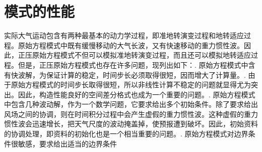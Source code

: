 \documentclass[a4paper,12pt]{article}
\begin{document}
\section{模式的性能}
实际大气运动包含有两种最基本的动力学过程，即准地转演变过程和地转适应过程。原始方程模式中既有缓慢移动的大气长波，又有快速移动的重力惯性波。因此，正压原始方程模式不但可以模拟准地转演变过程，而且还可以模拟地转适应过程。但是，正压原始方程模式也存在许多问题，现列出如下：.	原始方程模式中含有快波解，为保证计算的稳定，时间步长必须取得很短，因而增大了计算量。.	由于原始方程模式的时间步长取得很短，所以非线性计算不稳定的问题就显得尤为突出。因此，构造性能良好的空间差分格式也成为一个重要的问题。.	原始方程模式中包含几种波动解，作为一个数学问题，它要求给出多个初始条件。除了要求给出风场之间的协调，则在时间积分过程中会产生虚假的重力惯性波。这种虚假的重力惯性波会迅速增长，把天气尺度的波动掩盖掉，使预报遭到破坏。因此，初始资料的协调处理，即资料的初始化也是一个相当重要的问题。.	原始方程模式对边界条件很敏感，要求给出适当的边界条件
\end{document}
